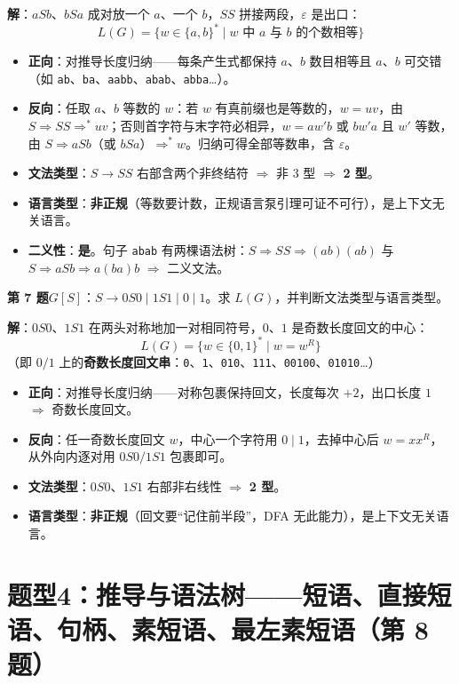 \documentclass[12pt,a4paper,fontset=windows]{ctexart}
\newcommand{\imp}{\ensuremath{\Rightarrow}}
\begin{document}
\textbf{解}：$aSb$、$bSa$ 成对放一个 $a$、一个 $b$，$SS$ 拼接两段，$\varepsilon$ 是出口：
\[
L(G)=\{w \in \{a,b\}^* \mid w\text{ 中 }a\text{ 与 }b\text{ 的个数相等}\}
\]
\begin{itemize}
\item \textbf{正向}：对推导长度归纳——每条产生式都保持 $a$、$b$ 数目相等且 $a$、$b$ 可交错（如 \texttt{ab}、\texttt{ba}、\texttt{aabb}、\texttt{abab}、\texttt{abba}…）。
\item \textbf{反向}：任取 $a$、$b$ 等数的 $w$：若 $w$ 有真前缀也是等数的，$w = uv$，由 $S \Rightarrow SS \Rightarrow^* uv$；否则首字符与末字符必相异，$w = aw'b$ 或 $bw'a$ 且 $w'$ 等数，由 $S \Rightarrow aSb$（或 $bSa$）$\Rightarrow^* w$。归纳可得全部等数串，含 $\varepsilon$。
\item \textbf{文法类型}：$S \to SS$ 右部含两个非终结符 \imp{} 非 3 型 \imp{} \textbf{2 型}。
\item \textbf{语言类型}：\textbf{非正规}（等数要计数，正规语言泵引理可证不可行），是上下文无关语言。
\item \textbf{二义性}：\textbf{是}。句子 \texttt{abab} 有两棵语法树：$S \Rightarrow SS \Rightarrow (ab)(ab)$ 与 $S \Rightarrow aSb \Rightarrow a(ba)b$ \imp{} 二义文法。
\end{itemize}

\begin{qbox}
{\large\bfseries 第 7 题}\quad $G[S]$：$S \to 0S0 \mid 1S1 \mid 0 \mid 1$。求 $L(G)$，并判断文法类型与语言类型。
\end{qbox}

\textbf{解}：$0S0$、$1S1$ 在两头对称地加一对相同符号，$0$、$1$ 是奇数长度回文的中心：
\[
L(G)=\{w \in \{0,1\}^* \mid w = w^R \}
\]
（即 $0/1$ 上的\textbf{奇数长度回文串}：\texttt{0}、\texttt{1}、\texttt{010}、\texttt{111}、\texttt{00100}、\texttt{01010}…）
\begin{itemize}
\item \textbf{正向}：对推导长度归纳——对称包裹保持回文，长度每次 $+2$，出口长度 $1$ \imp{} 奇数长度回文。
\item \textbf{反向}：任一奇数长度回文 $w$，中心一个字符用 $0 \mid 1$，去掉中心后 $w = x x^R$，从外向内逐对用 $0S0/1S1$ 包裹即可。
\item \textbf{文法类型}：$0S0$、$1S1$ 右部非右线性 \imp{} \textbf{2 型}。
\item \textbf{语言类型}：\textbf{非正规}（回文要``记住前半段''，DFA 无此能力），是上下文无关语言。
\end{itemize}

\section{题型4：推导与语法树——短语、直接短语、句柄、素短语、最左素短语（第 8 题）}
\end{document}

